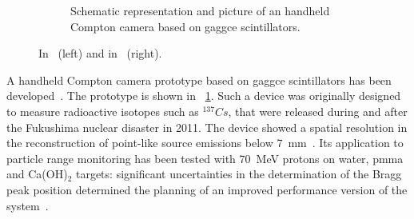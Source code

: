 \begin{figure}
\begin{subfigure}[t]{.49\textwidth}
\caption{Schematic representation and picture of an handheld Compton camera based on \gls{gaggce} scintillators.}
\label{chap2::fig::CC_handheld}
\end{subfigure}
\caption{In~\cite{Solevi2016} (left) and in~\cite{Kishimoto2015} (right).}
\label{chap2::fig::CC_scintillators}
\end{figure}

A handheld Compton camera prototype based on \gls{gaggce} scintillators has been developed~\parencite{Kishimoto2015}. The prototype is shown in \figurename~\ref{chap2::fig::CC_handheld}. Such a device was originally designed to measure radioactive isotopes such as $^{137}Cs$, that were released during and after the Fukushima nuclear disaster in 2011. The device showed a spatial resolution in the reconstruction of point-like source emissions below 7~mm~\parencite{Kishimoto2015}. Its application to particle range monitoring has been tested with 70~MeV protons on water, \gls{pmma} and Ca(OH)$_2$ targets: significant uncertainties in the determination of the Bragg peak position determined the planning of an improved performance version of the system~\parencite{Taya2016}.

